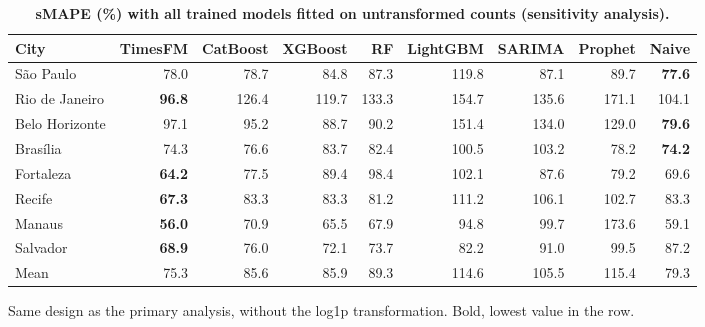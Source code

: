 
\begin{table}[!ht]
\centering
\small
\caption{\textbf{sMAPE (\%) with all trained models fitted on untransformed counts (sensitivity analysis).}}
\begin{tabular}{lrrrrrrrr}
\toprule
City & TimesFM & CatBoost & XGBoost & RF & LightGBM & SARIMA & Prophet & Naive \\
\midrule
S\~ao Paulo & 78.0 & 78.7 & 84.8 & 87.3 & 119.8 & 87.1 & 89.7 & \textbf{77.6} \\
Rio de Janeiro & \textbf{96.8} & 126.4 & 119.7 & 133.3 & 154.7 & 135.6 & 171.1 & 104.1 \\
Belo Horizonte & 97.1 & 95.2 & 88.7 & 90.2 & 151.4 & 134.0 & 129.0 & \textbf{79.6} \\
Bras\'ilia & 74.3 & 76.6 & 83.7 & 82.4 & 100.5 & 103.2 & 78.2 & \textbf{74.2} \\
Fortaleza & \textbf{64.2} & 77.5 & 89.4 & 98.4 & 102.1 & 87.6 & 79.2 & 69.6 \\
Recife & \textbf{67.3} & 83.3 & 83.3 & 81.2 & 111.2 & 106.1 & 102.7 & 83.3 \\
Manaus & \textbf{56.0} & 70.9 & 65.5 & 67.9 & 94.8 & 99.7 & 173.6 & 59.1 \\
Salvador & \textbf{68.9} & 76.0 & 72.1 & 73.7 & 82.2 & 91.0 & 99.5 & 87.2 \\
\midrule
Mean & 75.3 & 85.6 & 85.9 & 89.3 & 114.6 & 105.5 & 115.4 & 79.3 \\
\bottomrule
\end{tabular}
\begin{flushleft} Same design as the primary analysis, without the log1p transformation. Bold, lowest value in the row.
\end{flushleft}
\label{tabD}
\end{table}

